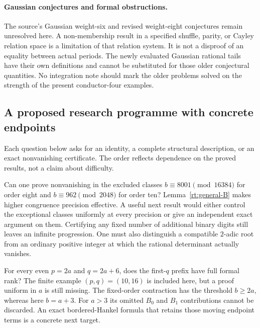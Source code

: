 \paragraph{Gaussian conjectures and formal obstructions.}
The source's Gaussian weight-six and revised weight-eight conjectures
remain unresolved here. A non-membership result in a specified
shuffle, parity, or Cayley relation space is a limitation of that
relation system. It is not a disproof of an equality between actual
periods. The newly evaluated Gaussian rational tails have their own
definitions and cannot be substituted for those older conjectural
quantities. No integration note should mark the older problems solved
on the strength of the present conductor-four examples.

\subsection{A proposed research programme with concrete endpoints}

Each question below asks for an identity, a complete structural
description, or an exact nonvanishing certificate. The order reflects
dependence on the proved results, not a claim about difficulty.

\begin{question}
Can one prove nonvanishing in the excluded classes
$b\equiv8001\pmod{16384}$ for order eight and
$b\equiv962\pmod{2048}$ for order ten?
Lemma~\ref{rt:general-B} makes higher congruence precision effective.
A useful next result would either control the exceptional classes
uniformly at every precision or give an independent exact argument on
them. Certifying any fixed number of additional binary digits still
leaves an infinite progression. One must also distinguish a compatible
$2$-adic root from an ordinary positive integer at which the rational
determinant actually vanishes.
\end{question}

\begin{question}
For every even $p=2a$ and $q=2a+6$, does the first-$q$ prefix have
full formal rank? The finite example $(p,q)=(10,16)$ is included here,
but a proof uniform in $a$ is still missing. The fixed-order contraction
has the threshold $b\ge2a$, whereas here $b=a+3$. For $a>3$ its
omitted $B_0$ and $B_1$ contributions cannot be discarded. An exact
bordered-Hankel formula that retains those moving endpoint terms is
a concrete next target.
\end{question}


